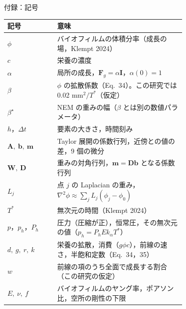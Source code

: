 \documentclass[aspectratio=169,11pt]{beamer}
\begin{document}
\appendix
\begin{frame}{付録：記号}
\small
\begin{tabular}{lp{0.72\linewidth}}
\toprule
記号 & 意味 \\
\midrule
$\phi$ & バイオフィルムの体積分率（成長の場，Klempt 2024） \\
$c$ & 栄養の濃度 \\
$\alpha$ & 局所の成長，$\mathbf F_g=\alpha\mathbf I$，$\alpha(0)=1$ \\
$\beta$ & $\phi$ の拡散係数（Eq.\ 34）。この研究では 0.02 mm$^2/T^*$（仮定） \\
$\beta^\star$ & NEM の重みの幅（$\beta$ とは別の数値パラメータ） \\
$h$，$\Delta t$ & 要素の大きさ，時間刻み \\
$\mathbf A,\ \mathbf b,\ \mathbf m$ & Taylor 展開の係数行列，近傍との値の差，9 個の微分 \\
$\mathbf W,\ \mathbf D$ & 重みの対角行列，$\mathbf m=\mathbf D\mathbf b$ となる係数行列 \\
$L_j$ & 点 $j$ の Laplacian の重み，$\nabla^2\phi\approx\sum_j L_j(\phi_j-\phi_0)$ \\
$T^*$ & 無次元の時間（Klempt 2024） \\
$p$，$p_h$，$P_h$ & 圧力（圧縮が正），恒常圧，その無次元の値（$p_h=P_h E k_\alpha T^*$） \\
$d,\ g,\ r,\ k$ & 栄養の拡散，消費（$g\phi c$），前線の速さ，半飽和定数（Eq.\ 34，35） \\
$w$ & 前線の項のうち全面で成長する割合（この研究の仮定） \\
$E,\ \nu,\ f$ & バイオフィルムのヤング率，ポアソン比，空所の剛性の下限 \\
\bottomrule
\end{tabular}
\end{frame}
\end{document}
